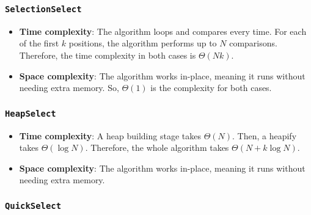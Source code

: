 \documentclass[acmconf,nonacm=true]{acmart}
\begin{document}

\subsubsection{\texttt{SelectionSelect}}

    \begin{itemize}
        \item \textbf{Time complexity}: The algorithm loops and compares every time. For each of the first $k$ positions, the algorithm performs up to $N$ comparisons. Therefore, the time complexity in both cases is $\Theta(Nk)$.
        \item \textbf{Space complexity}: The algorithm works in-place, meaning it runs without needing extra memory. So, $\Theta (1)$ is the complexity for both cases.
    \end{itemize}

\subsubsection{\texttt{HeapSelect}}

    \begin{itemize}
        \item \textbf{Time complexity}: A heap building stage takes $\Theta(N)$. Then, a heapify takes $\Theta(\log N)$. Therefore, the whole algorithm takes $\Theta(N + k \log N)$.
        \item \textbf{Space complexity}: The algorithm works in-place, meaning it runs without needing extra memory.
    \end{itemize}

\subsubsection{\texttt{QuickSelect}}
\end{document}
